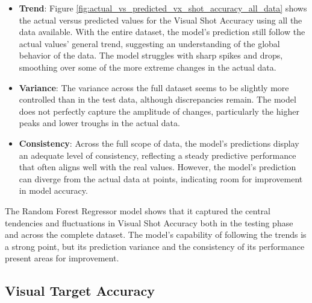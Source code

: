 \begin{itemize}
    \item \textbf{Trend}: Figure \ref{fig:actual_vs_predicted_vx_shot_accuracy_all_data} shows the actual versus predicted values for the Visual Shot Accuracy using all the data available.
          With the entire dataset, the model's prediction still follow the actual values' general trend, suggesting an understanding of the global behavior of the data. The model struggles
          with sharp spikes and drops, smoothing over some of the more extreme changes in the actual data.

    \item \textbf{Variance}: The variance across the full dataset seems to be slightly more controlled than in the test data, although discrepancies remain. The model does not perfectly capture
          the amplitude of changes, particularly the higher peaks and lower troughs in the actual data.

    \item \textbf{Consistency}: Across the full scope of data, the model's predictions display an adequate level of consistency, reflecting a steady predictive performance that often aligns well with the real values.
          However, the model's prediction can diverge from the actual data at points, indicating room for improvement in model accuracy.

\end{itemize}

The Random Forest Regressor model shows that it captured the central tendencies and fluctuations in Visual Shot Accuracy both in the testing phase and across the complete dataset. The model's capability of
following the trends is a strong point, but its prediction variance and the consistency of its performance present areas for improvement.


\subsection*{Visual Target Accuracy}

